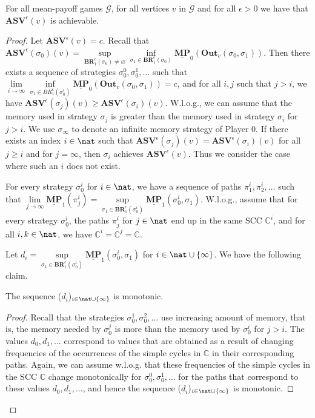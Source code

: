 \begin{conjecture}
For all mean-payoff games $\mathcal{G}$, for all vertices $v$ in $\mathcal{G}$ and for all $\epsilon > 0$ we have that $\mathbf{ASV}^{\epsilon}(v)$ is achievable.
\end{conjecture}
\begin{proof}
Let $\mathbf{ASV}^{\epsilon}(v) = c$.
Recall that $\mathbf{ASV}^{\epsilon}(\sigma_0)(v) = \sup\limits_{\mathbf{BR}^{\epsilon}_1(\sigma_0) \neq \varnothing}  \inf \limits_{\sigma_1 \in \mathbf{BR}^{\epsilon}_1(\sigma_0)} \underline{\mathbf{MP}}_0(\mathbf{Out}_v(\sigma_0,\sigma_1))$.
Then there exists a sequence of strategies $\sigma^0_0, \sigma^1_0, \dots$ such that $\lim \limits_{i \rightarrow \infty} \inf \limits_{\sigma_1 \in BR^{\epsilon}_1(\sigma^i_0)} \underline{\mathbf{MP}}_0(\mathbf{Out}_v(\sigma_0,\sigma_1))=c$, and for all $i, j$ such that $j > i$, we have $\mathbf{ASV}^{\epsilon}(\sigma_j)(v) \ge \mathbf{ASV}^{\epsilon}(\sigma_i)(v)$.
W.l.o.g., we can assume that the memory used in strategy $\sigma_j$ is greater than the memory used in strategy $\sigma_i$ for $j > i$.
We use $\sigma_\infty$ to denote an infinite memory strategy of Player $0$.
If there exists an index $i \in \nat$ such that $\mathbf{ASV}^{\epsilon}(\sigma_j)(v) = \mathbf{ASV}^{\epsilon}(\sigma_i)(v)$ for all $j \ge i$ and for $j=\infty$, then $\sigma_i$ achieves $\mathbf{ASV}^{\epsilon}(v)$.
Thus we consider the case where such an $i$ does not exist.

For every strategy $\sigma^i_0$ for $i \in \nat$, we have a sequence of paths $\pi^i_1, \pi^i_2, \dots$ such that $\lim \limits_{j \rightarrow \infty}\underline{\mathbf{MP}}_1(\pi^i_j) = \sup \limits_{\sigma_1 \in \mathbf{BR}^{\epsilon}_1(\sigma^i_0)} \underline{\mathbf{MP}}_1(\sigma^i_0,\sigma_1)$.
W.l.o.g., assume that for every strategy $\sigma^i_0$, the paths $\pi^i_j$ for $j \in \nat$ end up in the same SCC $\mathbb{C}^i$, and for all $i,k \in \nat$, we have $\mathbb{C}^i=\mathbb{C}^j=\mathbb{C}$.

Let $d_i = \sup \limits_{\sigma_1 \in \mathbf{BR}^{\epsilon}_1(\sigma^i_0)} \underline{\mathbf{MP}}_1(\sigma^i_0,\sigma_1)$ for $i \in \nat \cup \{\infty\}$.
We have the following claim.
\begin{lemma}[conjecture] \label{lem:monotone}
The sequence ($d_i$)$_{i \in \nat \cup \{\infty\}}$ is monotonic.
\end{lemma}
\begin{proof}
Recall that the strategies $\sigma^1_0, \sigma^2_0, \dots$ use increasing amount of memory, that is, the memory needed by $\sigma^j_0$ is more than the memory used by $\sigma^i_0$ for $j > i$.
The values $d_0, d_1, \dots$ correspond to values that are obtained as a result of changing frequencies of the occurrences of the simple cycles in $\mathbb{C}$ in their corresponding paths.
Again, we can assume w.l.o.g. that these frequencies of the simple cycles in the SCC $\mathbb{C}$ change monotonically for $\sigma^0_0, \sigma^1_0, \dots$ for the paths that correspond to these values $d_0, d_1, \dots$, and hence the sequence ($d_i$)$_{i \in \nat \cup \{\infty\}}$ is monotonic.
\end{proof}


\end{proof}
